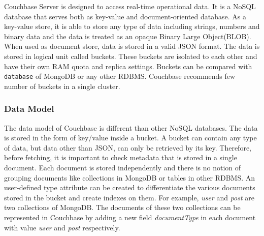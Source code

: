  Couchbase Server is designed to access real-time operational data. It is a NoSQL database that serves both as key-value and document-oriented database. As a key-value store, it is able to store any type of data including  strings, numbers and binary data and the data is treated as an opaque Binary Large Object(BLOB). When used as document store, data is stored in a valid JSON format. The data is stored in logical unit called buckets. These buckets are isolated to each other and have their own RAM quota and replica settings. Buckets can be compared with \texttt{database} of MongoDB or any other RDBMS. Couchbase recommends few number of buckets in a single cluster. 
 
 \subsubsection{Data Model}%
The data model of Couchbase is different than other NoSQL databases. The data is stored in the form of key/value inside a bucket. A bucket can contain any type of data, but data other than JSON, can only be retrieved by its key. Therefore, before fetching, it is important to check metadata that is stored in a single document. Each document is stored independently and there is no notion of grouping documents like collections in MongoDB or tables in other RDBMS. An user-defined type attribute can be created to differentiate the various documents stored in the bucket and  create indexes on them.  For example, \textit{user} and \textit{post} are two collections of MongoDB. The documents of these two collections can be represented in Couchbase by adding a new field \textit{documentType}  in each document with value \textit{user} and \textit{post} respectively.  

